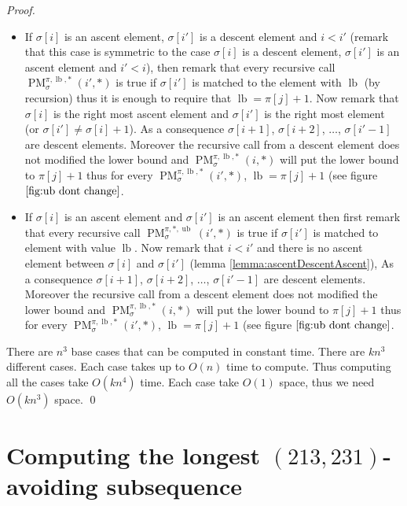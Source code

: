 \documentclass[a4paper]{llncs}
\newcommand{\ptext}{\pi}
\newcommand{\ppattern}{\sigma}
\DeclareMathOperator{\PMa}{PM}
\newcommand{\PM}[6]{\PMa_{{#1}}^{{#2},{#3},{#4}}({#5},{#6})}
\DeclareMathOperator{\lb}{lb}
\DeclareMathOperator{\ub}{ub}
\begin{document}
\begin{proof}
\begin{itemize}
\begin{itemize}
			\item If $\ppattern[i]$ is an ascent element, $\ppattern[i']$ is a descent element and $i<i'$ (remark that this case is symmetric to the case $\ppattern[i]$ is a descent element, $\ppattern[i']$ is an ascent element and $i'<i$), then
			remark that every recursive call
			$\PM{\sigma}{\ptext}{\lb}{*}{i'}{*}$ is true if $\sigma[i']$ is matched to the element with $\lb$ (by recursion) thus it is enough to require that $\lb=\ptext[j]+1$.
			Now remark that
			$\ppattern[i]$ is the right most ascent element and $\ppattern[i']$ is the right most element (or $\ppattern[i'] \neq \ppattern[i]+1$). 
			As a consequence $\sigma[i+1]$, $\sigma[i+2]$, $\ldots$, $\sigma[i'-1]$ are descent elements. Moreover the recursive call from a descent element does not modified the lower bound and $\PM{\sigma}{\ptext}{\lb}{*}{i}{*}$ will put the lower bound to $\ptext[j]+1$
			thus for every $\PM{\sigma}{\ptext}{\lb}{*}{i'}{*}$, $\lb=\ptext[j]+1$ (see figure $\ref{fig:ub dont change}$. 	

			
			\item If $\ppattern[i]$ is an ascent element and $\ppattern[i']$ is an ascent element then
			first remark that every recursive call
			$\PM{\sigma}{\ptext}{*}{\ub}{i'}{*}$ is true if $\sigma[i']$ is matched to element with value $\lb$. 
			Now remark that
			$i<i'$ and there is no  ascent element between $\ppattern[i]$ and $\ppattern[i']$ (lemma \ref{lemma:ascentDescentAscent}), 
			As a consequence $\sigma[i+1]$, $\sigma[i+2]$, $\ldots$, $\sigma[i'-1]$ are descent elements.  Moreover the recursive call from a descent element does not modified the lower bound and $\PM{\sigma}{\ptext}{\lb}{*}{i}{*}$ will put the lower bound to $\ptext[j]+1$ thus for every $\PM{\sigma}{\ptext}{\lb}{*}{i'}{*}$, $\lb=\ptext[j]+1$ (see figure $\ref{fig:ub dont change}$.
			

		\end{itemize}
\end{itemize}

There are $n^3$ base cases that can be computed in constant time.
There are $kn^3$ different cases. Each case takes up to $O(n)$ time to compute.
Thus computing all the cases take $O(kn^4)$ time.
Each case take $O(1)$ space, thus we need $O(kn^3)$ space.
\qed
\end{proof}



\section{Computing the longest $(213,231)$-avoiding subsequence}
\label{section:LCS}
\end{document}
